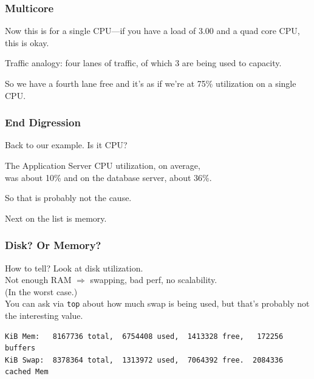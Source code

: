 \begin{frame}
\frametitle{Multicore}

\large
\begin{changemargin}{1cm}
Now this is for a single CPU---if you have a load of 3.00 and a quad core CPU, this is okay. 

Traffic analogy: four lanes of traffic, of which 3 are being used to capacity.

So we have a fourth lane free and it's as if we're at 75\% utilization on a single CPU.
\end{changemargin}

\end{frame}



\begin{frame}
\frametitle{End Digression}


\large
\begin{changemargin}{1cm}
Back to our example. Is it CPU? 

The Application Server CPU utilization, on average, \\
was about 10\% and on the database server, about 36\%. 

So that is probably not the cause. 

Next on the list is memory. 
\end{changemargin}
\end{frame}



\begin{frame}[fragile]
\frametitle{Disk? Or Memory?}

\large
\begin{changemargin}{1cm}
How to tell? Look at disk utilization. \\[1em]

Not enough RAM $\Rightarrow$ swapping, bad perf, no scalability.\\[1em]

(In the worst case.)\\[1em]

You can ask via \texttt{top} about how much swap is being used, but that's probably not the interesting value. 

{\scriptsize
\begin{verbatim}
KiB Mem:   8167736 total,  6754408 used,  1413328 free,   172256 buffers
KiB Swap:  8378364 total,  1313972 used,  7064392 free.  2084336 cached Mem
\end{verbatim}
}
\end{changemargin}

\end{frame}



